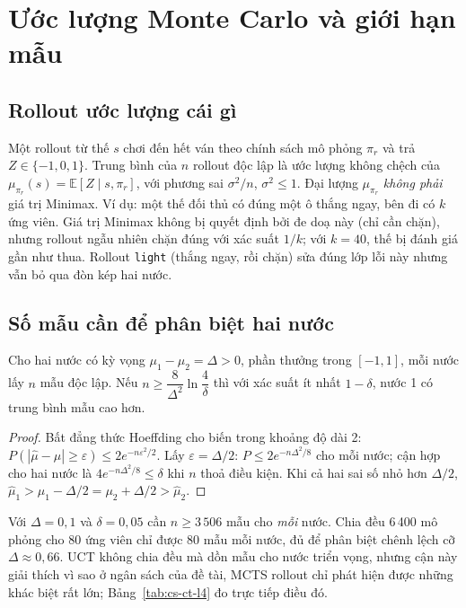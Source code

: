 \section{Ước lượng Monte Carlo và giới hạn mẫu}
\label{sec:cs-mc}
\subsection{Rollout ước lượng cái gì}
Một rollout từ thế $s$ chơi đến hết ván theo chính sách mô phỏng $\pi_r$ và trả $Z\in\{-1,0,1\}$. Trung bình của
$n$ rollout độc lập là ước lượng không chệch của $\mu_{\pi_r}(s)=\mathbb E[Z\mid s,\pi_r]$, với phương sai
$\sigma^2/n$, $\sigma^2\le 1$. Đại lượng $\mu_{\pi_r}$ \emph{không phải} giá trị Minimax. Ví dụ: một thế đối thủ
có đúng một ô thắng ngay, bên đi có $k$ ứng viên. Giá trị Minimax không bị quyết định bởi đe doạ này (chỉ cần
chặn), nhưng rollout ngẫu nhiên chặn đúng với xác suất $1/k$; với $k=40$, thế bị đánh giá gần như thua. Rollout
\texttt{light} (thắng ngay, rồi chặn) sửa đúng lớp lỗi này nhưng vẫn bỏ qua đòn kép hai nước.

\subsection{Số mẫu cần để phân biệt hai nước}
\begin{dinhly}
\label{dl:cs-hoeffding}
Cho hai nước có kỳ vọng $\mu_1-\mu_2=\Delta>0$, phần thưởng trong $[-1,1]$, mỗi nước lấy $n$ mẫu độc lập. Nếu
$n\ge \dfrac{8}{\Delta^2}\ln\dfrac{4}{\delta}$ thì với xác suất ít nhất $1-\delta$, nước 1 có trung bình mẫu cao hơn.
\end{dinhly}
\begin{proof}
Bất đẳng thức Hoeffding \cite{hoeffding1963} cho biến trong khoảng độ dài 2:
$P(|\hat\mu-\mu|\ge\varepsilon)\le 2e^{-n\varepsilon^2/2}$. Lấy $\varepsilon=\Delta/2$:
$P\le 2e^{-n\Delta^2/8}$ cho mỗi nước; cận hợp cho hai nước là $4e^{-n\Delta^2/8}\le\delta$ khi $n$ thoả điều kiện.
Khi cả hai sai số nhỏ hơn $\Delta/2$, $\hat\mu_1>\mu_1-\Delta/2=\mu_2+\Delta/2>\hat\mu_2$.
\end{proof}
Với $\Delta=0{,}1$ và $\delta=0{,}05$ cần $n\ge 3\,506$ mẫu cho \emph{mỗi} nước. Chia đều 6\,400 mô phỏng cho 80
ứng viên chỉ được 80 mẫu mỗi nước, đủ để phân biệt chênh lệch cỡ $\Delta\approx0{,}66$. UCT không chia đều mà dồn
mẫu cho nước triển vọng, nhưng cận này giải thích vì sao ở ngân sách của đề tài, MCTS rollout chỉ phát hiện được
những khác biệt rất lớn; Bảng~\ref{tab:cs-ct-l4} đo trực tiếp điều đó.

